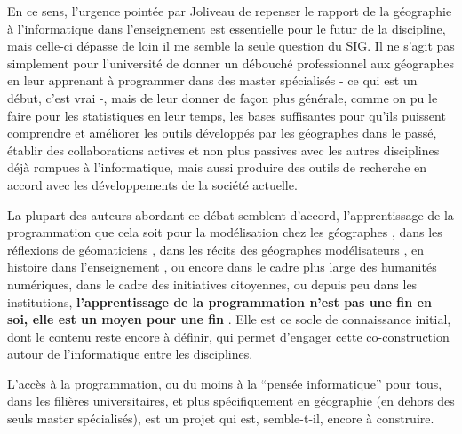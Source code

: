 
En ce sens, l'urgence pointée par Joliveau de repenser le rapport de la géographie à l'informatique dans l'enseignement est essentielle pour le futur de la discipline, mais celle-ci dépasse de loin il me semble la seule question du SIG. Il ne s'agit pas simplement pour l'université de donner un débouché professionnel aux géographes en leur apprenant à programmer dans des master spécialisés - ce qui est un début, c'est vrai -, mais de leur donner de façon plus générale, comme on pu le faire pour les statistiques en leur temps, les bases suffisantes pour qu'ils puissent comprendre et améliorer les outils développés par les géographes dans le passé, établir des collaborations actives et non plus passives avec les autres disciplines déjà rompues à l'informatique, mais aussi produire des outils de recherche en accord avec les développements de la société actuelle.

La plupart des auteurs abordant ce débat semblent d'accord, l'apprentissage de la programmation que cela soit pour la modélisation chez les géographes \autocite[64]{Banos2013}, dans les réflexions de géomaticiens \autocite{Joliveau2004}, dans les récits des géographes modélisateurs \autocites{LeBerre1987, Cuyala2014}, en histoire dans l'enseignement \autocite{Genet1993}, ou encore dans le cadre plus large des humanités numériques, dans le cadre des initiatives citoyennes, ou depuis peu dans les institutions, \textbf{l'apprentissage de la programmation n'est pas une fin en soi, elle est un moyen pour une fin} \autocite[67]{Deuff2014}. Elle est ce socle de connaissance initial, dont le contenu reste encore à définir, qui permet d'engager cette co-construction autour de l'informatique entre les disciplines.

L'accès à la programmation, ou du moins à la \enquote{pensée informatique} pour tous, dans les filières universitaires, et plus spécifiquement en géographie (en dehors des seuls master spécialisés), est un projet qui est, semble-t-il, encore à construire.



